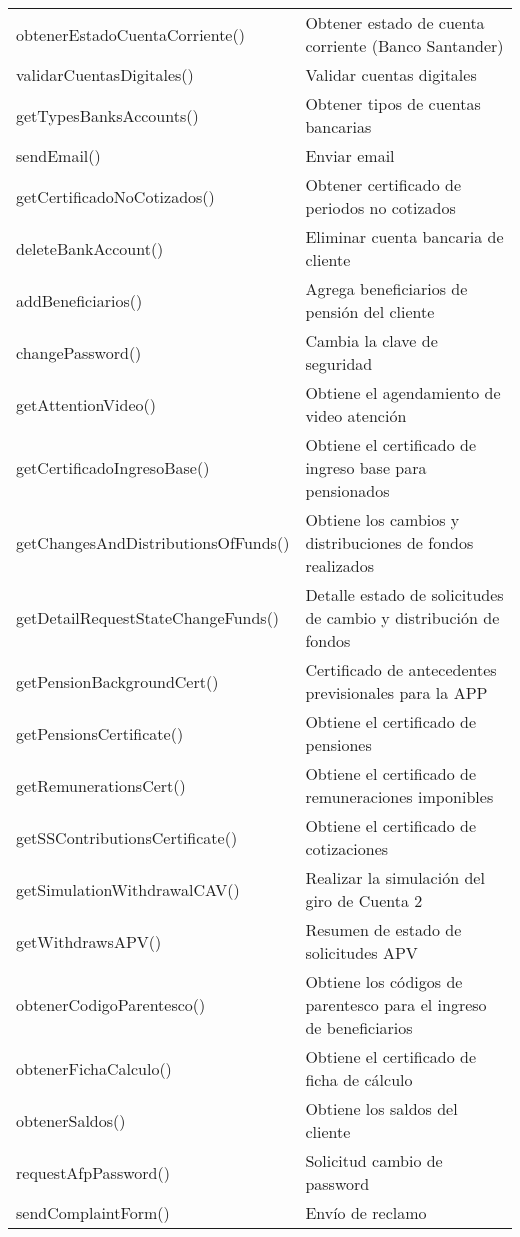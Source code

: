 \begin{longtable}{|p{7cm}|p{8.5cm}|}
    obtenerEstadoCuentaCorriente() & Obtener estado de cuenta corriente (Banco Santander) \\
    validarCuentasDigitales() & Validar cuentas digitales \\
    getTypesBanksAccounts() & Obtener tipos de cuentas bancarias \\
    sendEmail() & Enviar email \\
    getCertificadoNoCotizados() & Obtener certificado de periodos no cotizados \\
    deleteBankAccount() & Eliminar cuenta bancaria de cliente \\
    addBeneficiarios() & Agrega beneficiarios de pensión del cliente \\
    changePassword() & Cambia la clave de seguridad \\
    getAttentionVideo() & Obtiene el agendamiento de video atención \\ 
    getCertificadoIngresoBase() & Obtiene el certificado de ingreso base para pensionados \\
    getChangesAndDistributionsOfFunds() &	Obtiene los cambios y distribuciones de fondos realizados \\
    getDetailRequestStateChangeFunds() &	Detalle estado de solicitudes de cambio y distribución de fondos \\
    getPensionBackgroundCert() &	Certificado de antecedentes previsionales para la APP \\
    getPensionsCertificate() &	Obtiene el certificado de pensiones \\
    getRemunerationsCert() &	Obtiene el certificado de remuneraciones imponibles \\
    getSSContributionsCertificate() &	Obtiene el certificado de cotizaciones \\
    getSimulationWithdrawalCAV() &	Realizar la simulación del giro de Cuenta 2 \\
    getWithdrawsAPV() &	Resumen de estado de solicitudes APV \\
    obtenerCodigoParentesco() &	Obtiene los códigos de parentesco para el ingreso de beneficiarios \\
    obtenerFichaCalculo() &	Obtiene el certificado de ficha de cálculo \\
    obtenerSaldos() &	Obtiene los saldos del cliente \\
    requestAfpPassword() &	Solicitud cambio de password \\
    sendComplaintForm() &	Envío de reclamo \\

\end{longtable}
